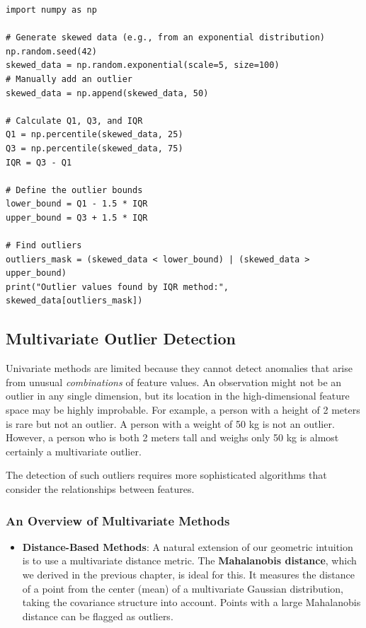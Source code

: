 \begin{itemize}
\begin{verbatim}
import numpy as np

# Generate skewed data (e.g., from an exponential distribution)
np.random.seed(42)
skewed_data = np.random.exponential(scale=5, size=100)
# Manually add an outlier
skewed_data = np.append(skewed_data, 50)

# Calculate Q1, Q3, and IQR
Q1 = np.percentile(skewed_data, 25)
Q3 = np.percentile(skewed_data, 75)
IQR = Q3 - Q1

# Define the outlier bounds
lower_bound = Q1 - 1.5 * IQR
upper_bound = Q3 + 1.5 * IQR

# Find outliers
outliers_mask = (skewed_data < lower_bound) | (skewed_data > upper_bound)
print("Outlier values found by IQR method:", skewed_data[outliers_mask])
\end{verbatim}

\subsection{Multivariate Outlier Detection}
\label{subsec:multivariate_outliers}
Univariate methods are limited because they cannot detect anomalies that arise from unusual \textit{combinations} of feature values. An observation might not be an outlier in any single dimension, but its location in the high-dimensional feature space may be highly improbable. For example, a person with a height of 2 meters is rare but not an outlier. A person with a weight of 50 kg is not an outlier. However, a person who is both 2 meters tall and weighs only 50 kg is almost certainly a multivariate outlier.

The detection of such outliers requires more sophisticated algorithms that consider the relationships between features.

\subsubsection*{An Overview of Multivariate Methods}
\begin{itemize}
    \item \textbf{Distance-Based Methods}: A natural extension of our geometric intuition is to use a multivariate distance metric. The \textbf{Mahalanobis distance}, which we derived in the previous chapter, is ideal for this. It measures the distance of a point from the center (mean) of a multivariate Gaussian distribution, taking the covariance structure into account. Points with a large Mahalanobis distance can be flagged as outliers.
    

\end{itemize}
\end{itemize}
